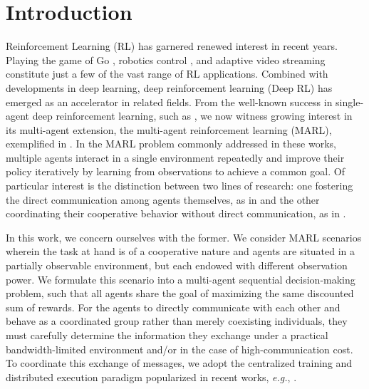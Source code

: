 \documentclass{article} %
\begin{document}
\section{Introduction}
\label{sec:intro}
Reinforcement Learning (RL) has garnered renewed interest in recent
years.  Playing the game of Go \citep{dqn}, robotics control
\citep{robot,ddpg}, and adaptive video streaming \citep{pensieve}
constitute just a few of the vast range of RL applications. Combined
with developments in deep learning, deep reinforcement learning (Deep
RL) has emerged as an accelerator in related fields. From the
well-known success in single-agent deep reinforcement learning, such
as \citet{dqn}, we now witness growing interest in its multi-agent
extension, the multi-agent reinforcement learning (MARL), exemplified
in \citet{gupta2017cooperative,lowe2017multi,coma,omidshafiei2017deep,
  dial, commnet, mordatch2017grounded,havrylov2017,lenient,bicnet,
  lola, tampuu2017multiagent, leibo2017multi,foerster2017stabilising}.
In the MARL problem commonly addressed in these works, multiple agents
interact in a single environment repeatedly and improve their policy
iteratively by learning from observations to achieve a common goal.
Of particular interest is the distinction between two lines of
research: one fostering the direct communication among agents
themselves, as in \citet{dial,commnet} and the other coordinating their
cooperative behavior without direct communication, as in
\citet{foerster2017stabilising,lenient,leibo2017multi}.

In this work, we concern ourselves with the former. We consider MARL
scenarios wherein the task at hand is of a cooperative nature and
agents are situated in a partially observable environment, but each
endowed with different observation power.  We formulate this scenario
into a multi-agent sequential decision-making problem, such that all
agents share the goal of maximizing the same discounted sum of
rewards. For the agents to directly communicate with each other and
behave as a coordinated group rather than merely coexisting
individuals, they must carefully determine the information they
exchange under a practical bandwidth-limited environment and/or in the case
of high-communication cost. To coordinate this exchange of messages,
we adopt the centralized training and distributed execution paradigm
popularized in recent works, {\em e.g.}, \citet{coma, lowe2017multi, vdn,
  qmix, gupta2017cooperative}.
\end{document}
